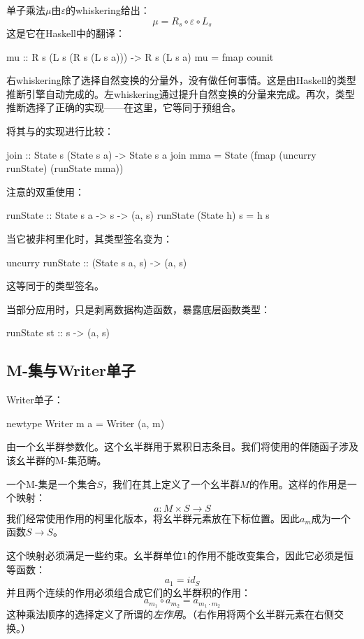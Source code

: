 \documentclass[DaoFP]{subfiles}
\begin{document}
单子乘法$\mu$由$\varepsilon$的whiskering给出：
\[ \mu = R_s \circ \varepsilon \circ L_s \]
这是它在Haskell中的翻译：
\begin{haskell}
mu :: R s (L s (R s (L s a))) -> R s (L s a)
mu = fmap counit
\end{haskell}
右whiskering除了选择自然变换的分量外，没有做任何事情。这是由Haskell的类型推断引擎自动完成的。左whiskering通过提升自然变换的分量来完成。再次，类型推断选择了正确的实现——在这里，它等同于预组合。

将其与的实现进行比较：
\begin{haskell}
join :: State s (State s a) -> State s a
join mma = State (fmap (uncurry runState) (runState mma))
\end{haskell}
注意的双重使用：
\begin{haskell}
runState :: State s a -> s -> (a, s)
runState (State h) s = h s
\end{haskell}
当它被非柯里化时，其类型签名变为：
\begin{haskell}
uncurry runState :: (State s a, s) -> (a, s)
\end{haskell}
这等同于的类型签名。

当部分应用时，只是剥离数据构造函数，暴露底层函数类型：
\begin{haskell}
runState st :: s -> (a, s)
\end{haskell}

\subsection{M-集与Writer单子}

Writer单子：
\begin{haskell}
newtype Writer m a = Writer (a, m)
\end{haskell}
由一个幺半群参数化。这个幺半群用于累积日志条目。我们将使用的伴随函子涉及该幺半群的M-集范畴。

一个M-集是一个集合$S$，我们在其上定义了一个幺半群$M$的作用。这样的作用是一个映射：
\[a \colon M \times S \to S \]
我们经常使用作用的柯里化版本，将幺半群元素放在下标位置。因此$a_m$成为一个函数$S \to S$。

这个映射必须满足一些约束。幺半群单位$1$的作用不能改变集合，因此它必须是恒等函数：
\[ a_1 = id_S \]
并且两个连续的作用必须组合成它们的幺半群积的作用：
\[ a_{m_1} \circ a_{m_2} = a_{m_1 \cdot m_2} \]
这种乘法顺序的选择定义了所谓的\emph{左作用}。（右作用将两个幺半群元素在右侧交换。）
\end{document}
